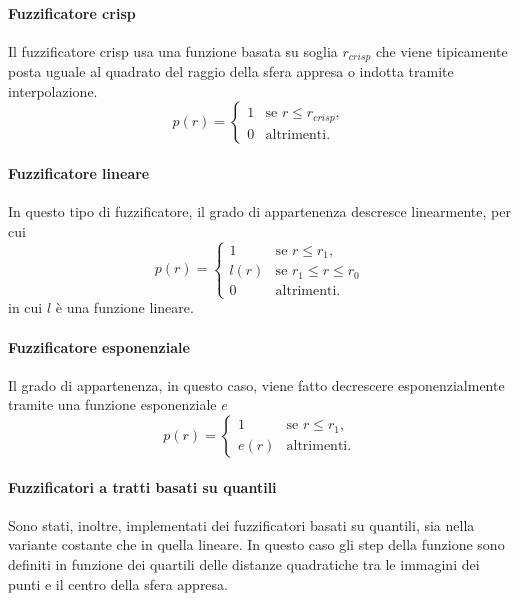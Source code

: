 \documentclass[12pt]{report}
\theoremstyle{definition}
\begin{document}
\paragraph{Fuzzificatore crisp}
Il fuzzificatore crisp usa una funzione basata su soglia $r_{crisp}$ che viene tipicamente posta uguale al quadrato del raggio della sfera appresa o indotta tramite interpolazione.
\begin{equation}
    p(r)= \begin{cases} 1 & \mbox{se } r \leq r_{crisp}, \\ 0 & \mbox{altrimenti.} \end{cases}
\end{equation}

\paragraph{Fuzzificatore lineare}
In questo tipo di fuzzificatore, il grado di appartenenza descresce linearmente, per cui
\begin{equation}
    p(r)= \begin{cases} 1 & \mbox{se } r \leq r_1, \\l(r) & \mbox{se } r_1 \leq r \leq r_0 \\ 0 & \mbox{altrimenti.} \end{cases}
\end{equation}
in cui $l$ è una funzione lineare.

\paragraph{Fuzzificatore esponenziale} Il grado di appartenenza, in questo caso, viene fatto decrescere esponenzialmente tramite una funzione esponenziale $e$
\begin{equation}
    p(r)= \begin{cases} 1 & \mbox{se } r \leq r_1, \\e(r) & \mbox{altrimenti}. \end{cases}
\end{equation}

\paragraph{Fuzzificatori a tratti basati su quantili} Sono stati, inoltre, implementati dei fuzzificatori basati su quantili, sia nella variante costante che in quella lineare.
In questo caso gli step della funzione sono definiti in funzione dei quartili delle distanze quadratiche tra le immagini dei punti e il centro della sfera appresa.
\end{document}
